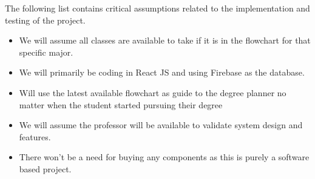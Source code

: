 The following list contains critical assumptions related to the implementation and testing of the project.

\begin{itemize}
  \item We will assume all classes are available to take if it is in the flowchart for that specific major.
  \item We will primarily be coding in React JS and using Firebase as the database.
  \item Will use the latest available flowchart as guide to the degree planner no matter when the student started pursuing their degree
  \item We will assume the professor will be available to validate system design and features.
  \item There won't be a need for buying any components as this is purely a software based project.
\end{itemize}